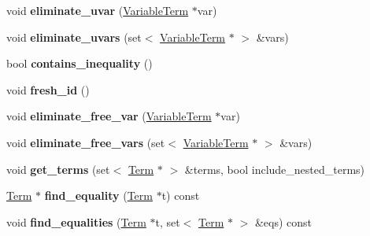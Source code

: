 \begin{DoxyCompactItemize}
\item 
\hypertarget{classConstraint_ac73c014f2e92c23f70392eb91d4c8565}{void {\bfseries eliminate\-\_\-uvar} (\hyperlink{classVariableTerm}{\-Variable\-Term} $\ast$var)}\label{classConstraint_ac73c014f2e92c23f70392eb91d4c8565}

\item 
\hypertarget{classConstraint_a12754a0a4ee272cea8fca8170f7cab5d}{void {\bfseries eliminate\-\_\-uvars} (set$<$ \hyperlink{classVariableTerm}{\-Variable\-Term} $\ast$ $>$ \&vars)}\label{classConstraint_a12754a0a4ee272cea8fca8170f7cab5d}

\item 
\hypertarget{classConstraint_ae8dfaa20ca8e1f4c464a40a9c11c3643}{bool {\bfseries contains\-\_\-inequality} ()}\label{classConstraint_ae8dfaa20ca8e1f4c464a40a9c11c3643}

\item 
\hypertarget{classConstraint_aa38c7080ec5d83c64c9093f4b81ec341}{void {\bfseries fresh\-\_\-id} ()}\label{classConstraint_aa38c7080ec5d83c64c9093f4b81ec341}

\item 
\hypertarget{classConstraint_a1b9f2421f5ac66f14524fdded2dfb762}{void {\bfseries eliminate\-\_\-free\-\_\-var} (\hyperlink{classVariableTerm}{\-Variable\-Term} $\ast$var)}\label{classConstraint_a1b9f2421f5ac66f14524fdded2dfb762}

\item 
\hypertarget{classConstraint_a5d4f06f6b68485a8e299e7b2d8b833b5}{void {\bfseries eliminate\-\_\-free\-\_\-vars} (set$<$ \hyperlink{classVariableTerm}{\-Variable\-Term} $\ast$ $>$ \&vars)}\label{classConstraint_a5d4f06f6b68485a8e299e7b2d8b833b5}

\item 
\hypertarget{classConstraint_a69517893aff23dee8ea80154467b2161}{void {\bfseries get\-\_\-terms} (set$<$ \hyperlink{classTerm}{\-Term} $\ast$ $>$ \&terms, bool include\-\_\-nested\-\_\-terms)}\label{classConstraint_a69517893aff23dee8ea80154467b2161}

\item 
\hypertarget{classConstraint_a06b67f3e9c44f5aab49007698fcd0b14}{\hyperlink{classTerm}{\-Term} $\ast$ {\bfseries find\-\_\-equality} (\hyperlink{classTerm}{\-Term} $\ast$t) const }\label{classConstraint_a06b67f3e9c44f5aab49007698fcd0b14}

\item 
\hypertarget{classConstraint_a5e2c9fc0f958461379dd08c0f55c7e51}{void {\bfseries find\-\_\-equalities} (\hyperlink{classTerm}{\-Term} $\ast$t, set$<$ \hyperlink{classTerm}{\-Term} $\ast$ $>$ \&eqs) const }\label{classConstraint_a5e2c9fc0f958461379dd08c0f55c7e51}


\end{DoxyCompactItemize}
